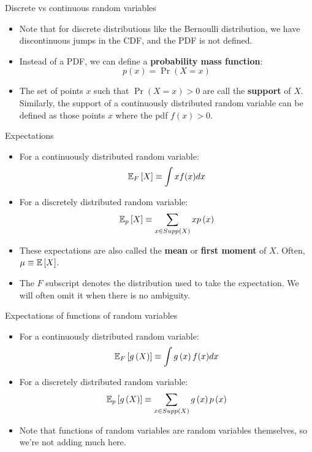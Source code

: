 \begin{frame}{Discrete vs continuous random variables}
\begin{itemize}
	\item Note that for discrete distributions like the Bernoulli distribution, we
		have discontinuous jumps in the CDF, and the PDF is not defined.
		
	\medskip
	\item Instead of a PDF, we can define a {\bf probability mass function}:
	\[
		p\left(x\right) = \Pr\left(X=x\right)
	\]
	
	\medskip
	\item The set of points $x$ such that $\Pr\left(X=x\right)>0$ are call the {\bf support}
			of $X$. Similarly, the support of a continuously distributed random variable
			can be defined as those points $x$ where the pdf $f(x)>0$.
	
	
		
\end{itemize}
\end{frame}





\begin{frame}{Expectations}
\begin{itemize}
	\item For a continuously distributed random variable:\[
		\mathbb{E}_F \left[ X \right] \equiv \int xf(x)dx
	\]
	
	\medskip
	\item For a discretely distributed random variable:\[
		\mathbb{E}_p \left[ X \right] \equiv \sum_{x\in Supp\left(X\right)} x p\left(x\right)
	\]
	
	\medskip
	\item These expectations are also called the {\bf mean} or {\bf first moment} of $X$. Often, $\mu\equiv \mathbb{E}\left[X\right]$.
		
	\medskip
	\item The $F$ subscript denotes the distribution used to take the expectation. We will often omit it when there is no ambiguity.
\end{itemize}
\end{frame}


\begin{frame}{Expectations of functions of random variables}
\begin{itemize}
	\item For a continuously distributed random variable:\[
		\mathbb{E}_F \left[ g\left(X\right) \right] \equiv \int g\left(x\right)f(x)dx
	\]
	
	\medskip
	\item For a discretely distributed random variable:\[
		\mathbb{E}_p \left[ g\left(X\right) \right] \equiv \sum_{x\in Supp\left(X\right)} g\left(x\right) p\left(x\right)
	\]
	
	\medskip
	\item Note that functions of random variables are random variables themselves, so we're not adding much here.

\end{itemize}
\end{frame}



